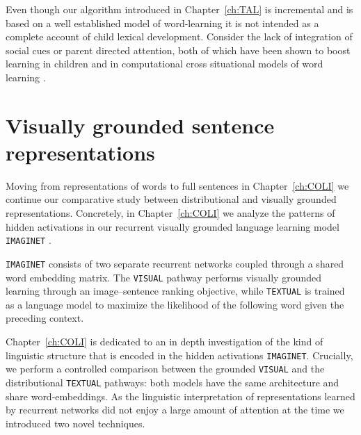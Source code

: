 Even though our algorithm introduced in Chapter~\ref{ch:TAL} is incremental
and is based on a well established model of word-learning \citep{fazly.etal.10} it is not intended as a
complete account of child lexical development. Consider 
the lack of integration of social cues or parent directed attention, both of which 
have been shown to boost learning in children 
\citep{gleitman1990structural,tomasello1995two} and in computational cross situational
models of word learning \citep{yu2007unified,lazaridou2016multimodal}.

\section{Visually grounded sentence representations}
Moving from representations of words to full sentences in Chapter~\ref{ch:COLI} we continue
our comparative study between distributional and visually grounded representations. 
Concretely, in Chapter~\ref{ch:COLI} we analyze the patterns of hidden activations in 
our recurrent visually grounded language learning model 
\texttt{IMAGINET} \citep{chrupala2015learning}. 

\texttt{IMAGINET} consists of two separate recurrent networks coupled through a 
shared word embedding matrix. The \texttt{VISUAL}
pathway performs visually grounded learning through an image--sentence ranking objective, 
while \texttt{TEXTUAL} is trained as a language model to maximize the likelihood of the following word
given the preceding context.


Chapter~\ref{ch:COLI} is dedicated to an in depth investigation
of the kind of linguistic structure that is encoded in the hidden activations \texttt{IMAGINET}. 
Crucially, we perform a controlled comparison between the grounded \texttt{VISUAL} and the distributional 
 \texttt{TEXTUAL} pathways: both models have the same architecture and share word-embeddings.
 As the linguistic interpretation of representations learned by recurrent networks did not enjoy a 
 large amount of  attention at the time we introduced two novel techniques. 
 
